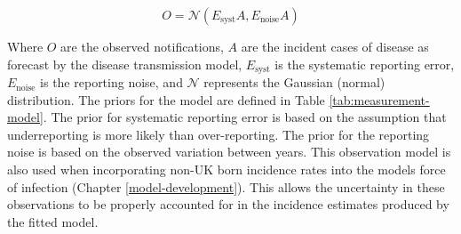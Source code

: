 \documentclass[11pt,twoside]{bristolthesis}
\begin{document}
  \[O = \mathcal{N}\left(E_{\text{syst}}A, E_{\text{noise}}A\right)\]
  
  Where \(O\) are the observed notifications, \(A\) are the incident cases of disease as forecast by the disease transmission model, \(E_{\text{syst}}\) is the systematic reporting error, \(E_{\text{noise}}\) is the reporting noise, and \(\mathcal{N}\) represents the Gaussian (normal) distribution. The priors for the model are defined in Table \ref{tab:measurement-model}. The prior for systematic reporting error is based on the assumption that underreporting is more likely than over-reporting. The prior for the reporting noise is based on the observed variation between years. This observation model is also used when incorporating non-UK born incidence rates into the models force of infection (Chapter \ref{model-development}). This allows the uncertainty in these observations to be properly accounted for in the incidence estimates produced by the fitted model.
  
\end{document}
